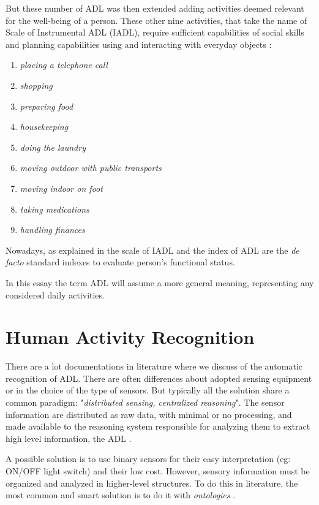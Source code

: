 \documentclass{thesisreport}
\begin{document}
But these number of ADL was then extended adding activities deemed relevant for the well-being of a person. These other nine activities, that take the name of Scale of Instrumental ADL \cite{lawton1970assessment} (IADL), require sufficient capabilities of social skills and planning capabilities using and interacting with everyday objects \cite{buoncompagni2017towards}:
\begin{enumerate}[noitemsep,topsep=1pt,parsep=1pt,partopsep=1pt]
    \item \textit{placing a telephone call}
    \item \textit{shopping}
    \item \textit{preparing food}
    \item \textit{housekeeping}
    \item \textit{doing the laundry}
    \item \textit{moving outdoor with public transports}
    \item \textit{moving indoor on foot}
    \item \textit{taking medications}
    \item \textit{handling finances}
\end{enumerate}
Nowadays, as explained in \cite{bruno2014public} the scale of IADL and the index of ADL are the \textit{de facto} standard indexes to evaluate person’s functional status\cite{buoncompagni2017towards}. 

In this essay the term ADL will assume a more general meaning, representing any  considered daily activities. 

\section{Human Activity Recognition}
There are a lot documentations in literature where we discuss of the automatic recognition of ADL. There are often differences about adopted sensing equipment or in the choice of the type of sensors. But typically all the solution share a common paradigm: "\textit{distributed sensing, centralized reasoning}". The sensor information are distributed as raw data, with minimal or no processing, and made available to the reasoning system responsible for analyzing them to extract high level information, the ADL \cite{buoncompagni2017towards}.   

A possible solution is to use binary sensors for their easy interpretation (eg: ON/OFF light switch) and their low cost. However, sensory information must be organized and analyzed in higher-level structures. To do this in literature, the most common and smart solution is to do it with \textit{ontologies} \cite{buoncompagni2017towards}.
\end{document}
